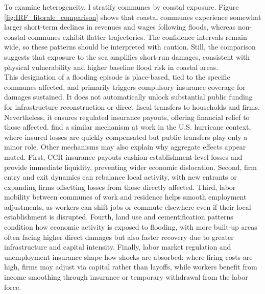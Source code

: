 To examine heterogeneity, I stratify communes by coastal exposure. Figure \ref{fig:IRF_litorale_comparison} shows that coastal communes experience somewhat larger short-term declines in revenues and wages following floods, whereas non-coastal communes exhibit flatter trajectories. The confidence intervals remain wide, so these patterns should be interpreted with caution. Still, the comparison suggests that exposure to the sea amplifies short-run damages, consistent with physical vulnerability and higher baseline flood risk in coastal areas.\\

This designation of a flooding episode is place-based, tied to the specific communes affected, and primarily triggers compulsory insurance coverage for damages sustained. It does not automatically unlock substantial public funding for infrastructure reconstruction or direct fiscal transfers to households and firms. Nevertheless, it ensures regulated insurance payouts, offering financial relief to those affected. \cite{indaco2021hurricanes} find a similar mechanism at work in the U.S. hurricane context, where insured losses are quickly compensated but public transfers play only a minor role.
Other mechanisms may also explain why aggregate effects appear muted. First, CCR insurance payouts cushion establishment-level losses and provide immediate liquidity, preventing wider economic dislocation. Second, firm entry and exit dynamics can rebalance local activity, with new entrants or expanding firms offsetting losses from those directly affected. Third, labor mobility between communes of work and residence helps smooth employment adjustments, as workers can shift jobs or commute elsewhere even if their local establishment is disrupted. Fourth, land use and cementification patterns condition how economic activity is exposed to flooding, with more built-up areas often facing higher direct damages but also faster recovery due to greater infrastructure and capital intensity. Finally, labor market regulation and unemployment insurance shape how shocks are absorbed: where firing costs are high, firms may adjust via capital rather than layoffs, while workers benefit from income smoothing through insurance or temporary withdrawal from the labor force.

